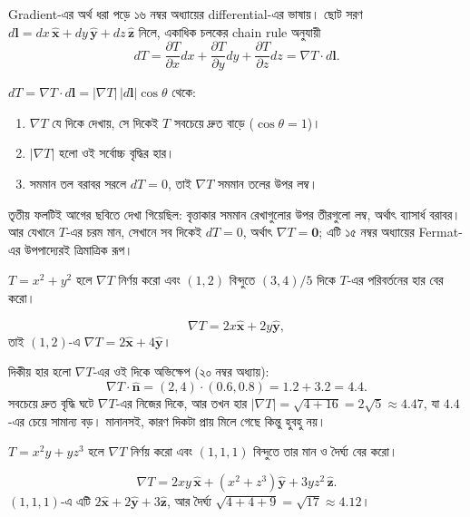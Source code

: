 \documentclass[11pt]{article}
\begin{document}
Gradient-এর অর্থ ধরা পড়ে ১৬ নম্বর অধ্যায়ের differential-এর ভাষায়। ছোট
সরণ $d\mathbf{l} = dx\,\hat{\mathbf{x}} + dy\,\hat{\mathbf{y}}
+ dz\,\hat{\mathbf{z}}$ নিলে, একাধিক চলকের chain rule অনুযায়ী
\[
  dT = \frac{\partial T}{\partial x}dx + \frac{\partial T}{\partial y}dy
  + \frac{\partial T}{\partial z}dz = \nabla T \cdot d\mathbf{l} .
\]

\begin{idea}[তিনটি সরাসরি ফল]
$dT = \nabla T \cdot d\mathbf{l} = |\nabla T|\,|d\mathbf{l}|\cos\theta$
থেকে:
\begin{enumerate}
  \item $\nabla T$ যে দিকে দেখায়, সে দিকেই $T$ সবচেয়ে দ্রুত বাড়ে
        ($\cos\theta = 1$)।
  \item $|\nabla T|$ হলো ওই সর্বোচ্চ বৃদ্ধির হার।
  \item সমমান তল বরাবর সরলে $dT = 0$, তাই $\nabla T$ সমমান তলের উপর লম্ব।
\end{enumerate}
\end{idea}

তৃতীয় ফলটিই আগের ছবিতে দেখা গিয়েছিল: বৃত্তাকার সমমান রেখাগুলোর উপর তীরগুলো
লম্ব, অর্থাৎ ব্যাসার্ধ বরাবর। আর যেখানে $T$-এর চরম মান, সেখানে সব দিকেই
$dT = 0$, অর্থাৎ $\nabla T = \mathbf{0}$; এটি ১৫ নম্বর অধ্যায়ের
Fermat-এর উপপাদ্যেরই ত্রিমাত্রিক রূপ।

\begin{example}
$T = x^{2}+y^{2}$ হলে $\nabla T$ নির্ণয় করো এবং $(1,2)$ বিন্দুতে
$(3,4)/5$ দিকে $T$-এর পরিবর্তনের হার বের করো।
\end{example}

\begin{solbox}
\[
  \nabla T = 2x\hat{\mathbf{x}} + 2y\hat{\mathbf{y}} ,
\]
তাই $(1,2)$-এ $\nabla T = 2\hat{\mathbf{x}} + 4\hat{\mathbf{y}}$।

দিকীয় হার হলো $\nabla T$-এর ওই দিকে অভিক্ষেপ (২০ নম্বর অধ্যায়):
\[
  \nabla T \cdot \hat{\mathbf{n}} = (2,4)\cdot(0.6, 0.8) = 1.2 + 3.2 = 4.4 .
\]
সবচেয়ে দ্রুত বৃদ্ধি ঘটে $\nabla T$-এর নিজের দিকে, আর তখন হার
$|\nabla T| = \sqrt{4+16} = 2\sqrt{5} \approx 4.47$, যা $4.4$-এর চেয়ে সামান্য
বড়। মানানসই, কারণ দিকটা প্রায় মিলে গেছে কিন্তু হুবহু নয়।
\end{solbox}

 $T = x^{2}y + yz^{3}$ হলে $\nabla T$ নির্ণয় করো এবং $(1,1,1)$
বিন্দুতে তার মান ও দৈর্ঘ্য বের করো।

\begin{sol}
\[
  \nabla T = 2xy\,\hat{\mathbf{x}} + \left( x^{2}+z^{3} \right)\hat{\mathbf{y}}
  + 3yz^{2}\,\hat{\mathbf{z}} .
\]
$(1,1,1)$-এ এটি $2\hat{\mathbf{x}} + 2\hat{\mathbf{y}} + 3\hat{\mathbf{z}}$,
আর দৈর্ঘ্য $\sqrt{4+4+9} = \sqrt{17} \approx 4.12$।
\end{sol}
\end{document}
